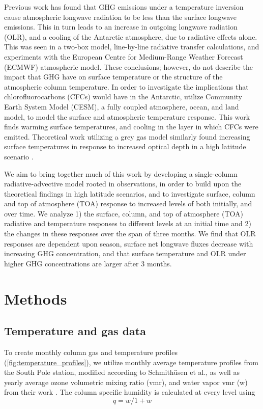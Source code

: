 \documentclass[12]{article}
\begin{document}
Previous work has found that GHG emissions under a temperature inversion cause atmospheric longwave radiation to be less than the surface longwave emissions. This in turn leads to an increase in outgoing longwave radiation (OLR), and a cooling of the Antarctic atmosphere, due to radiative effects alone\citep{schmithusen_how_2015}. This was seen in a two-box model, line-by-line radiative transfer calculations, and experiments with the European Centre for Medium-Range Weather Forecast (ECMWF) atmospheric model. These conclusions; however, do not describe the impact that GHG have on surface temperature or the structure of the atmospheric column temperature. In order to investigate the implications that chlorofluorocarbons (CFCs) would have in the Antarctic, \cite{flanner_climate_2018} utilize Community Earth System Model (CESM), a fully coupled atmosphere, ocean, and land model, to model the surface and atmospheric temperature response. This work finds warming surface temperatures, and cooling in the layer in which CFCs were emitted. Theoretical work utilizing a grey gas model similarly found increasing surface temperatures in response to increased optical depth in a high latitude scenario \citep{payne_conceptual_2015}.

We aim to bring together much of this work by developing a single-column radiative-advective model rooted in observations, in order to build upon the theoretical findings in high latitude scenarios, and to investigate surface, column and top of atmosphere (TOA) response to increased levels of  both initially, and over time. We analyze 1) the surface, column, and top of atmosphere (TOA) radiative and temperature responses to different  levels at an initial time and 2) the changes in these responses over the span of three months. We find that OLR responses are dependent upon season, surface net longwave fluxes decrease with increasing GHG concentration, and that surface temperature and OLR under higher GHG concentrations are larger after 3 months.


\section{Methods}
\subsection{Temperature and gas data}
 To create monthly column gas and temperature profiles (\ref{fig:temperature_profiles}), we utilize monthly average temperature profiles from the South Pole station, modified according to Schmithüsen et al., as well as yearly average ozone volumetric mixing ratio (vmr), and water vapor vmr (w) from their work \citep{schmithusen_how_2015}. The column specific humidity is calculated at every level using
\begin{equation}
    q = w/1+w
\end{equation}
\end{document}
